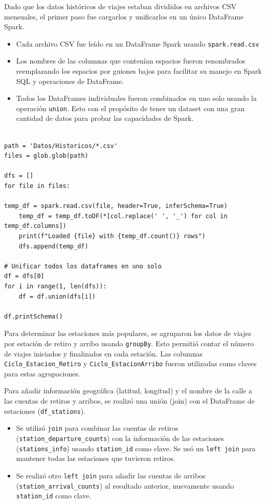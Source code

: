 \documentclass[12pt]{article}
\begin{document}
    Dado que los datos históricos de viajes estaban divididos en archivos CSV mensuales, el primer paso fue cargarlos y unificarlos en un único DataFrame Spark.
    \begin{itemize}
        \item Cada archivo CSV fue leído en un DataFrame Spark usando \texttt{spark.read.csv}
        \item Los nombres de las columnas que contenían espacios fueron renombrados reemplazando los espacios por guiones bajos para facilitar su manejo en Spark SQL y operaciones de DataFrame.
        \item Todos los DataFrames individuales fueron combinados en uno solo usando la operación \texttt{union}. Esto con el propósito de tener un dataset con una gran cantidad de datos para probar las capacidades de Spark.
    \end{itemize}

    \begin{lstlisting}[style=python, caption={Carga y unificación de archivos CSV mensuales.}, label={lst:load_data}]

path = 'Datos/Historicos/*.csv'
files = glob.glob(path)

dfs = []
for file in files:

temp_df = spark.read.csv(file, header=True, inferSchema=True)
    temp_df = temp_df.toDF(*[col.replace(' ', '_') for col in temp_df.columns])
    print(f"Loaded {file} with {temp_df.count()} rows")
    dfs.append(temp_df)

# Unificar todos los dataframes en uno solo
df = dfs[0]
for i in range(1, len(dfs)):
    df = df.union(dfs[i])

df.printSchema()
    \end{lstlisting}

    Para determinar las estaciones más populares, se agruparon los datos de viajes por estación de retiro y arribo usando \texttt{groupBy}. Esto permitió contar el número de viajes iniciados y finalizados en cada estación. Las columnas \texttt{Ciclo\_Estacion\_Retiro} y \texttt{Ciclo\_EstacionArribo} fueron utilizadas como claves para estas agrupaciones.

    Para añadir información geográfica (latitud, longitud) y el nombre de la calle a las cuentas de retiros y arribos, se realizó una unión (join) con el DataFrame de estaciones (\texttt{df\_stations}).
    \begin{itemize}
        \item Se utilizó \texttt{join} para combinar las cuentas de retiros (\texttt{station\_departure\_counts}) con la información de las estaciones (\texttt{stations\_info}) usando \texttt{station\_id} como clave. Se usó un \texttt{left join} para mantener todas las estaciones que tuvieron retiros.
        \item Se realizó otro \texttt{left join} para añadir las cuentas de arribos (\texttt{station\_arrival\_counts}) al resultado anterior, nuevamente usando \texttt{station\_id} como clave.
    \end{itemize}
\end{document}
